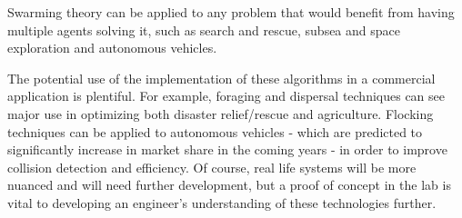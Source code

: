 Swarming theory can be applied to any problem that would benefit from having multiple agents solving it, such as search and rescue, subsea and space exploration and autonomous vehicles. 

The potential use of the implementation of these algorithms in a commercial application is plentiful. For example, foraging and dispersal techniques can see major use in optimizing both disaster relief/rescue and agriculture. Flocking techniques can be applied to autonomous vehicles - which are predicted to significantly increase in market share in the coming years - in order to improve collision detection and efficiency. Of course, real life systems will be more nuanced and will need further development, but a proof of concept in the lab is vital to developing an engineer's understanding of these technologies further.

